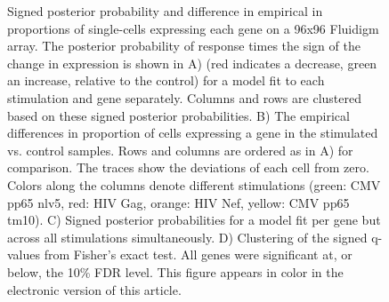 \documentclass[12pt,oupdraft]{biostatistics}
\begin{document}
\begin{figure}
\caption{Signed posterior probability and difference in empirical  in proportions of single-cells expressing each gene on a 96x96 Fluidigm array. The posterior probability of response times the sign of the change in expression is shown in A) (red indicates a decrease, green an increase, relative to the control) for a model fit to each stimulation and gene separately. Columns and rows are clustered based on these signed posterior probabilities. B) The empirical differences in proportion of cells expressing a gene in the stimulated vs. control samples. Rows and columns are ordered as in A) for comparison. The traces show the deviations of each cell from zero. Colors along the columns denote different stimulations (green: CMV pp65 nlv5, red: HIV Gag, orange: HIV Nef, yellow: CMV pp65 tm10). C) Signed posterior probabilities for a model fit per gene but across all stimulations simultaneously. D) Clustering of the signed q-values from Fisher's exact test. All genes  were significant at, or below, the 10\% FDR level. This figure appears in color in the electronic version of this article.}
\label{fig:fluidigm}
\end{figure}
\end{document}
